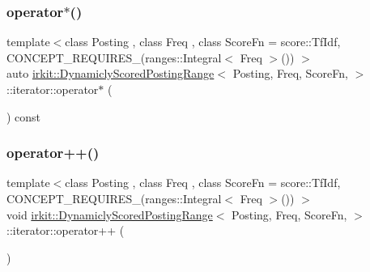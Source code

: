 \mbox{\label{classirkit_1_1DynamiclyScoredPostingRange_1_1iterator_a1608a0963401d8842b1f0e3726e44449}} 
\subsubsection{\texorpdfstring{operator$\ast$()}{operator*()}}
{\footnotesize\ttfamily template$<$class Posting , class Freq , class Score\+Fn  = score\+::\+Tf\+Idf, C\+O\+N\+C\+E\+P\+T\+\_\+\+R\+E\+Q\+U\+I\+R\+E\+S\+\_\+(ranges\+::\+Integral$<$ Freq $>$()) $>$ \\
auto \mbox{\hyperlink{classirkit_1_1DynamiclyScoredPostingRange}{irkit\+::\+Dynamicly\+Scored\+Posting\+Range}}$<$ Posting, Freq, Score\+Fn, $>$\+::iterator\+::operator$\ast$ (\begin{DoxyParamCaption}{ }\end{DoxyParamCaption}) const\hspace{0.3cm}{\ttfamily [inline]}}

\mbox{\label{classirkit_1_1DynamiclyScoredPostingRange_1_1iterator_aeb75d55de7b324e3ff31aa7496a0f7c5}} 
\subsubsection{\texorpdfstring{operator++()}{operator++()}\hspace{0.1cm}{\footnotesize\ttfamily [1/2]}}
{\footnotesize\ttfamily template$<$class Posting , class Freq , class Score\+Fn  = score\+::\+Tf\+Idf, C\+O\+N\+C\+E\+P\+T\+\_\+\+R\+E\+Q\+U\+I\+R\+E\+S\+\_\+(ranges\+::\+Integral$<$ Freq $>$()) $>$ \\
void \mbox{\hyperlink{classirkit_1_1DynamiclyScoredPostingRange}{irkit\+::\+Dynamicly\+Scored\+Posting\+Range}}$<$ Posting, Freq, Score\+Fn, $>$\+::iterator\+::operator++ (\begin{DoxyParamCaption}{ }\end{DoxyParamCaption})\hspace{0.3cm}{\ttfamily [inline]}}

